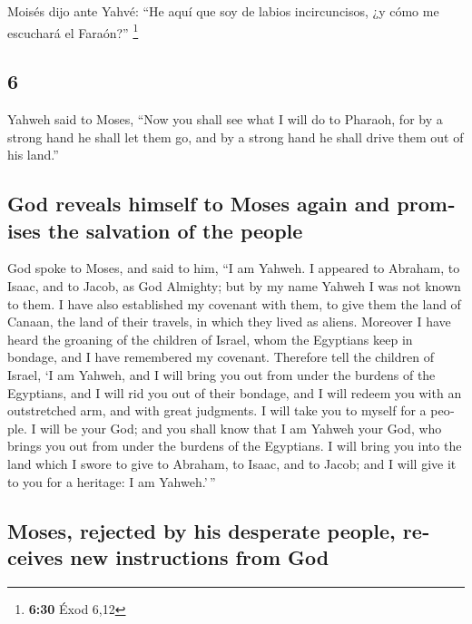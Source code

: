 \begin{paracol}{2}
 Moisés dijo ante Yahvé: ``He aquí que soy de labios
incircuncisos, ¿y cómo me escuchará el Faraón?'' \footnote{\textbf{6:30}
  Éxod 6,12}

\switchcolumn
\begin{otherlanguage}{english}

\hypertarget{section-11}{%
\section{6}\label{section-11}}

 Yahweh said to Moses, ``Now you shall see what I will do
to Pharaoh, for by a strong hand he shall let them go, and by a strong
hand he shall drive them out of his land.''

\hypertarget{god-reveals-himself-to-moses-again-and-promises-the-salvation-of-the-people}{%
\subsection{God reveals himself to Moses again and promises the
salvation of the
people}\label{god-reveals-himself-to-moses-again-and-promises-the-salvation-of-the-people}}

 God spoke to Moses, and said to him, ``I am Yahweh.
 I appeared to Abraham, to Isaac, and to Jacob, as God
Almighty; but by my name Yahweh I was not known to them. 
I have also established my covenant with them, to give them the land of
Canaan, the land of their travels, in which they lived as aliens.
 Moreover I have heard the groaning of the children of
Israel, whom the Egyptians keep in bondage, and I have remembered my
covenant.  Therefore tell the children of Israel, `I am
Yahweh, and I will bring you out from under the burdens of the
Egyptians, and I will rid you out of their bondage, and I will redeem
you with an outstretched arm, and with great judgments.  I
will take you to myself for a people. I will be your God; and you shall
know that I am Yahweh your God, who brings you out from under the
burdens of the Egyptians.  I will bring you into the land
which I swore to give to Abraham, to Isaac, and to Jacob; and I will
give it to you for a heritage: I am Yahweh.'\,''

\hypertarget{moses-rejected-by-his-desperate-people-receives-new-instructions-from-god}{%
\subsection{Moses, rejected by his desperate people, receives new
instructions from
God}\label{moses-rejected-by-his-desperate-people-receives-new-instructions-from-god}}


\end{otherlanguage}
\end{paracol}
